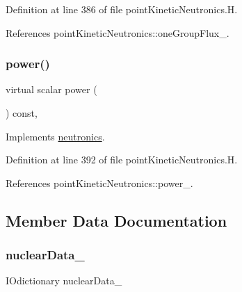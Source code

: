 Definition at line 386 of file point\+Kinetic\+Neutronics.\+H.



References point\+Kinetic\+Neutronics\+::one\+Group\+Flux\+\_\+.

\mbox{\label{classFoam_1_1pointKineticNeutronics_a96a4e39548be52ca563c1e5b7dd885b8}} 
\subsubsection{\texorpdfstring{power()}{power()}}
{\footnotesize\ttfamily virtual scalar power (\begin{DoxyParamCaption}{ }\end{DoxyParamCaption}) const\hspace{0.3cm}{\ttfamily [inline]}, {\ttfamily [virtual]}}



Implements \hyperlink{classFoam_1_1neutronics_a786b9a8bc4f4d4ba9489ba8fce53adc6}{neutronics}.



Definition at line 392 of file point\+Kinetic\+Neutronics.\+H.



References point\+Kinetic\+Neutronics\+::power\+\_\+.



\subsection{Member Data Documentation}
\mbox{\label{classFoam_1_1pointKineticNeutronics_a5f8311a3a430c76dd8ad948460751646}} 
\subsubsection{\texorpdfstring{nuclear\+Data\+\_\+}{nuclearData\_}}
{\footnotesize\ttfamily I\+Odictionary nuclear\+Data\+\_\+\hspace{0.3cm}{\ttfamily [protected]}}




